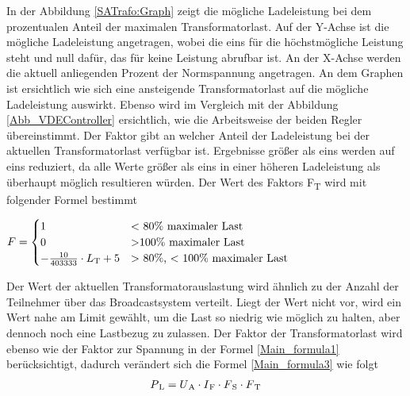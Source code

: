 In der Abbildung \ref{SATrafo:Graph} zeigt die mögliche Ladeleistung bei dem prozentualen Anteil der maximalen Transformatorlast. Auf der Y-Achse ist die mögliche Ladeleistung angetragen, wobei die eins für die höchstmögliche Leistung steht und null dafür, das für keine Leistung abrufbar ist. An der X-Achse werden die aktuell anliegenden Prozent der Normspannung angetragen. An dem Graphen ist ersichtlich wie sich eine ansteigende Transformatorlast auf die mögliche Ladeleistung auswirkt. Ebenso wird im Vergleich mit der Abbildung \ref{Abb_VDEController} ersichtlich, wie die Arbeitsweise der beiden Regler übereinstimmt. Der Faktor gibt an welcher Anteil der Ladeleistung bei der aktuellen Transformatorlast verfügbar ist. Ergebnisse größer als eins werden auf eins reduziert, da alle Werte größer als eins in einer höheren Ladeleistung als überhaupt möglich resultieren würden. Der Wert des Faktors F\textsubscript{T} wird mit folgender Formel bestimmt \\
\begin{center}
	$ F = \begin{cases}
	1 &  \text{$<$ 80\% maximaler Last} \\
	0 &  \text{$>$100\% maximaler Last} \\
	- \frac{10}{403333} \cdot L\textsubscript{T} + 5 & \text{$>$ 80\%, $<$ 100\% maximaler Last}
	\end{cases}$
\end{center}
Der Wert der aktuellen Transformatorauslastung wird ähnlich zu der Anzahl der Teilnehmer über das Broadcastsystem verteilt. Liegt der Wert nicht vor, wird ein Wert nahe am Limit gewählt, um die Last so niedrig wie möglich zu halten, aber dennoch noch eine Lastbezug zu zulassen. Der Faktor der Transformatorlast wird ebenso wie der Faktor zur Spannung in der Formel \ref{Main_formula1} berücksichtigt, dadurch verändert sich die Formel \ref{Main_formula3} wie folgt
\begin{align}
	P\textsubscript{L} = U\textsubscript{A} \cdot I\textsubscript{F} \cdot F\textsubscript{S} \cdot F\textsubscript{T} \label{Main_formula4}
\end{align}


